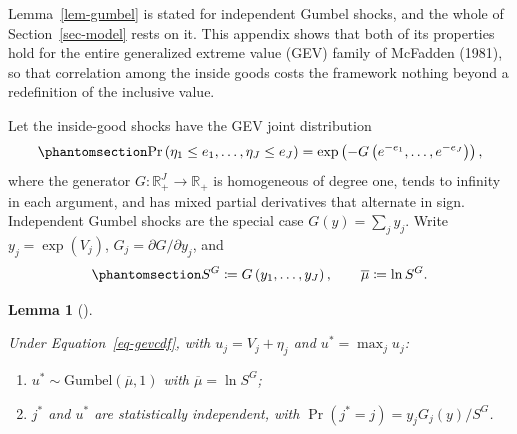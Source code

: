 \documentclass[
  letterpaper,
  DIV=11,
  numbers=noendperiod]{scrartcl}
\theoremstyle{plain}
\newtheorem{lemma}{Lemma}[section]
\theoremstyle{plain}
\theoremstyle{remark}
\begin{document}
Lemma~\ref{lem-gumbel} is stated for independent Gumbel shocks, and the
whole of Section~\ref{sec-model} rests on it. This appendix shows that
both of its properties hold for the entire generalized extreme value
(GEV) family of McFadden (1981), so that correlation among the inside
goods costs the framework nothing beyond a redefinition of the inclusive
value.

Let the inside-good shocks have the GEV joint distribution
\begin{equation}\protect\phantomsection\label{eq-gevcdf}{
\Pr \left( \eta_1 \le e_1, \ldots, \eta_J \le e_J \right)
= \exp \left( - G \left( e^{-e_1}, \ldots, e^{-e_J} \right) \right),
}\end{equation} where the generator
\(G : \mathbb{R}^J_{+} \to \mathbb{R}_{+}\) is homogeneous of degree
one, tends to infinity in each argument, and has mixed partial
derivatives that alternate in sign. Independent Gumbel shocks are the
special case \(G(y) = \sum_j y_j\). Write \(y_j = \exp(V_j)\),
\(G_j = \partial G / \partial y_j\), and
\begin{equation}\protect\phantomsection\label{eq-gevmu}{
S^{G} \coloneqq G \left( y_1, \ldots, y_J \right),
\qquad
\overline{\mu} \coloneqq \ln S^{G}.
}\end{equation}

\begin{lemma}[]\protect\hypertarget{lem-gev}{}\label{lem-gev}

Under Equation~\ref{eq-gevcdf}, with \(u_j = V_j + \eta_j\) and
\(u^* = \max_{j} u_j\):

\begin{enumerate}
\def\labelenumi{(\roman{enumi})}
\item
  \(u^* \sim \text{Gumbel} \left( \overline{\mu}, 1 \right)\) with
  \(\overline{\mu} = \ln S^{G}\);
\item
  \(j^*\) and \(u^*\) are statistically independent, with
  \(\Pr(j^* = j) = y_j G_j(y) / S^{G}\).
\end{enumerate}

\end{lemma}
\end{document}
